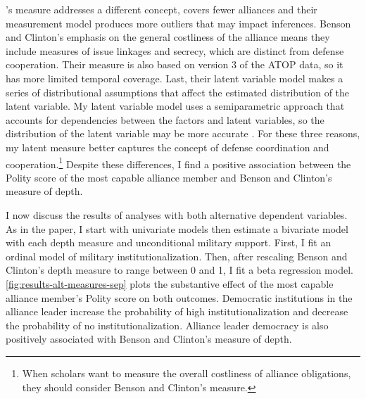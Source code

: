 \documentclass[12pt]{article}
\begin{document}
\citet{BensonClinton2016}'s measure addresses a different concept, covers fewer alliances and their measurement model produces more outliers that may impact inferences.
Benson and Clinton's emphasis on the general costliness of the alliance means they include measures of issue linkages and secrecy, which are distinct from defense cooperation. 
Their measure is also based on version 3 of the ATOP data, so it has more limited temporal coverage. 
Last, their latent variable model makes a series of distributional assumptions that affect the estimated distribution of the latent variable. 
My latent variable model uses a semiparametric approach that accounts for dependencies between the factors and latent variables, so the distribution of the latent variable may be more accurate \citep{Murrayetal2013}.
For these three reasons, my latent measure better captures the concept of defense coordination and cooperation.\footnote{When scholars want to measure the overall costliness of alliance obligations, they should consider Benson and Clinton's measure.} 
Despite these differences, I find a positive association between the Polity score of the most capable alliance member and Benson and Clinton's measure of depth. 


I now discuss the results of analyses with both alternative dependent variables. 
As in the paper, I start with univariate models then estimate a bivariate model with each depth measure and unconditional military support. 
First, I fit an ordinal model of military institutionalization. 
Then, after rescaling Benson and Clinton's depth measure to range between 0 and 1, I fit a beta regression model. 
\autoref{fig:results-alt-measures-sep} plots the substantive effect of the most capable alliance member's Polity score on both outcomes. 
Democratic institutions in the alliance leader increase the probability of high institutionalization and decrease the probability of no institutionalization. 
Alliance leader democracy is also positively associated with Benson and Clinton's measure of depth. 
\end{document}
